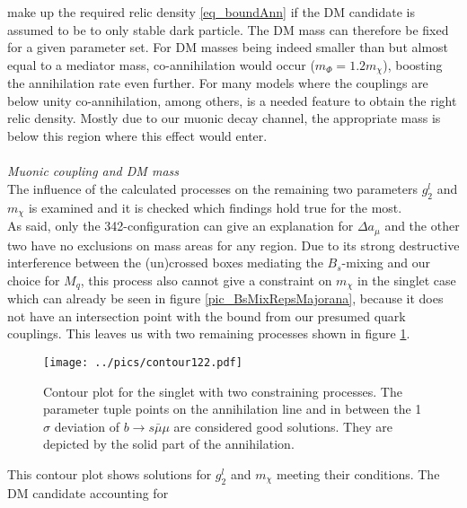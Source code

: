 make up the required relic density \eqref{eq_boundAnn} if the DM candidate is assumed to be to only stable dark particle. The DM mass can therefore 
be fixed for a given parameter set.
For DM masses being indeed smaller than but almost equal to a mediator mass,
co-annihilation would occur ($m_\Phi = 1.2 m_\chi$), boosting the annihilation rate even further. For many models where the couplings are below unity
co-annihilation, among others, is a needed feature to obtain the right relic density. Mostly due to our muonic decay channel, the appropriate mass is 
below this region where this effect would enter. 
\\ \\ \textit{Muonic coupling and DM mass}\\
\noindent The influence of the calculated processes on the remaining two parameters $g_2^l$ and $m_\chi$ is examined and it is checked
which findings hold true for the most. \\
\noindent As said, only the 342-configuration can give an explanation for $\Delta a_\mu$ and the other two have no exclusions on mass areas for any 
region. Due to its strong destructive interference between the (un)crossed boxes mediating the $B_s$-mixing and our choice for $M_q$, this process 
also cannot give a constraint on $m_\chi$ in the singlet case which can already be seen in figure \ref{pic_BsMixRepsMajorana}, because it does 
not have an intersection point with the bound from our presumed quark couplings. This leaves us with two remaining processes shown in figure 
\ref{pic_SinRes}. 
\begin{figure}[t]
 \texttt{[image: ../pics/contour122.pdf]}
 \caption{Contour plot for the singlet with two constraining processes. The parameter tuple points on the annihilation line and in between the 
 1 $\sigma$ deviation of $b\rightarrow s\bar\mu\mu$ are considered good solutions. They are depicted by the solid
 part of the annihilation.}
 \label{pic_SinRes}
\end{figure}
This contour plot shows solutions for $g_2^l$ and $m_\chi$ meeting their conditions. The DM candidate accounting for  
